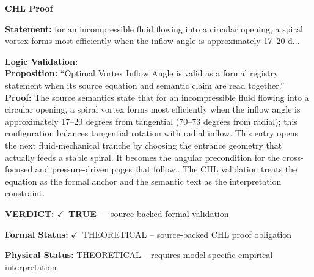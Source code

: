 \vspace{0.45em}
\noindent\textbf{CHL Proof}\par
\textbf{Statement:} for an incompressible fluid flowing into a circular opening, a spiral vortex forms most
efficiently when the inflow angle is approximately 17--20 d...

\textbf{Logic Validation:}\\
\textbf{Proposition:} ``Optimal Vortex Inflow Angle is valid as a formal registry statement when its source
equation and semantic claim are read together.''\\
\textbf{Proof:} The source semantics state that for an incompressible fluid flowing into a circular
opening, a spiral vortex forms most efficiently when the inflow angle is approximately
17--20 degrees from tangential (70--73 degrees from radial); this configuration balances
tangential rotation with radial inflow. This entry opens the next fluid-mechanical
tranche by choosing the entrance geometry that actually feeds a stable spiral. It
becomes the angular precondition for the cross-focused and pressure-driven pages that
follow.. The CHL validation treats the equation as the formal anchor and the semantic
text as the interpretation constraint.

\textbf{VERDICT:} \ensuremath{\checkmark}\ \textbf{TRUE} --- source-backed formal validation

\textbf{Formal Status:} \ensuremath{\checkmark}\ THEORETICAL -- source-backed CHL proof obligation

\textbf{Physical Status:} THEORETICAL -- requires model-specific empirical interpretation
\par\vspace{0.45em}
\par
\ifTZPDarkEdition
{}
\fi
\endgroup
\endgroup
